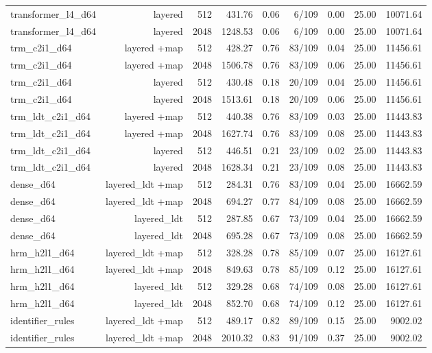 \begin{table}[t]
\begin{adjustbox}{max width=\linewidth}
\begin{tabular}{lrrrrrrrr}
transformer\_l4\_d64 & layered & 512 & 431.76 & 0.06 & 6/109 & 0.00 & 25.00 & 10071.64 \\
transformer\_l4\_d64 & layered & 2048 & 1248.53 & 0.06 & 6/109 & 0.00 & 25.00 & 10071.64 \\
trm\_c2i1\_d64 & layered +map & 512 & 428.27 & 0.76 & 83/109 & 0.04 & 25.00 & 11456.61 \\
trm\_c2i1\_d64 & layered +map & 2048 & 1506.78 & 0.76 & 83/109 & 0.06 & 25.00 & 11456.61 \\
trm\_c2i1\_d64 & layered & 512 & 430.48 & 0.18 & 20/109 & 0.04 & 25.00 & 11456.61 \\
trm\_c2i1\_d64 & layered & 2048 & 1513.61 & 0.18 & 20/109 & 0.06 & 25.00 & 11456.61 \\
trm\_ldt\_c2i1\_d64 & layered +map & 512 & 440.38 & 0.76 & 83/109 & 0.03 & 25.00 & 11443.83 \\
trm\_ldt\_c2i1\_d64 & layered +map & 2048 & 1627.74 & 0.76 & 83/109 & 0.08 & 25.00 & 11443.83 \\
trm\_ldt\_c2i1\_d64 & layered & 512 & 446.51 & 0.21 & 23/109 & 0.02 & 25.00 & 11443.83 \\
trm\_ldt\_c2i1\_d64 & layered & 2048 & 1628.34 & 0.21 & 23/109 & 0.08 & 25.00 & 11443.83 \\
dense\_d64 & layered\_ldt +map & 512 & 284.31 & 0.76 & 83/109 & 0.04 & 25.00 & 16662.59 \\
dense\_d64 & layered\_ldt +map & 2048 & 694.27 & 0.77 & 84/109 & 0.08 & 25.00 & 16662.59 \\
dense\_d64 & layered\_ldt & 512 & 287.85 & 0.67 & 73/109 & 0.04 & 25.00 & 16662.59 \\
dense\_d64 & layered\_ldt & 2048 & 695.28 & 0.67 & 73/109 & 0.08 & 25.00 & 16662.59 \\
hrm\_h2l1\_d64 & layered\_ldt +map & 512 & 328.28 & 0.78 & 85/109 & 0.07 & 25.00 & 16127.61 \\
hrm\_h2l1\_d64 & layered\_ldt +map & 2048 & 849.63 & 0.78 & 85/109 & 0.12 & 25.00 & 16127.61 \\
hrm\_h2l1\_d64 & layered\_ldt & 512 & 329.28 & 0.68 & 74/109 & 0.08 & 25.00 & 16127.61 \\
hrm\_h2l1\_d64 & layered\_ldt & 2048 & 852.70 & 0.68 & 74/109 & 0.12 & 25.00 & 16127.61 \\
identifier\_rules & layered\_ldt +map & 512 & 489.17 & 0.82 & 89/109 & 0.15 & 25.00 & 9002.02 \\
identifier\_rules & layered\_ldt +map & 2048 & 2010.32 & 0.83 & 91/109 & 0.37 & 25.00 & 9002.02 \\

\end{tabular}
\end{adjustbox}
\end{table}
